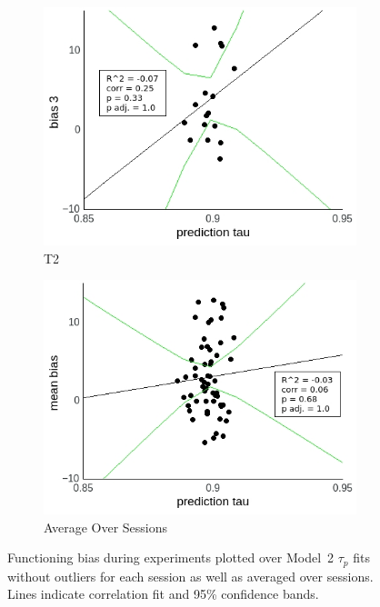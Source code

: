 \documentclass[a4paper]{scrreprt}
\begin{document}
\begin{figure}
\begin{subfigure}[b]{0.49\textwidth}
        \includegraphics[width=\textwidth]{figs/sec3/pred/predno_diff_3_mod2dat.jpeg}
        \caption{T2}
    \end{subfigure}
    \begin{subfigure}[b]{0.49\textwidth}
        \includegraphics[width=\textwidth]{figs/sec3/pred/predno_diff_mean_mod2dat.jpeg}
        \caption{Average Over Sessions}
    \end{subfigure}
\caption{Functioning bias during experiments plotted over Model~2 $\tau_p$ fits without outliers for each session as well as averaged over sessions. Lines indicate correlation fit and 95\% confidence bands.}
\label{fig:predno_diff_mod2dat}
\end{figure}
\end{document}
